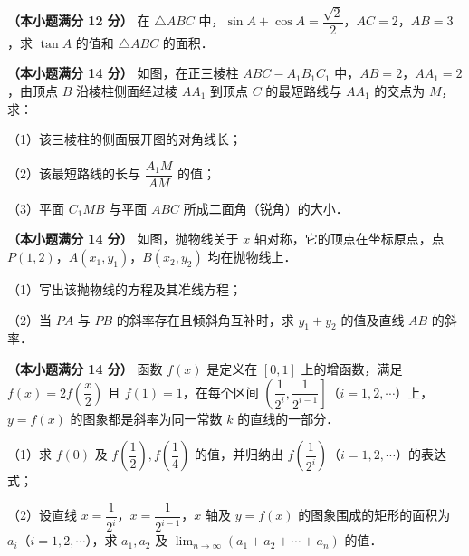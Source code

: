 \begin{question}
\textbf{（本小题满分 12 分）} 
在 $\triangle ABC$ 中，$\sin A+\cos A=\dfrac{\sqrt{2}}{2}$，$AC=2$，$AB=3$，求 $\tan A$ 的值和 $\triangle ABC$ 的面积．

\Needspace{0.4\textheight}
\end{question}
\begin{question}
\textbf{（本小题满分 14 分）} 
如图，在正三棱柱 $ABC-A_1B_1C_1$ 中，$AB=2$，$AA_1=2$，由顶点 $B$ 沿棱柱侧面经过棱 $AA_1$ 到顶点 $C$ 的最短路线与 $AA_1$ 的交点为 $M$，求：

（1）该三棱柱的侧面展开图的对角线长；

（2）该最短路线的长与 $\dfrac{A_1M}{AM}$ 的值；

（3）平面 $C_1MB$ 与平面 $ABC$ 所成二面角（锐角）的大小．
\nopagebreak[4]
\begin{center}\end{center}
\nopagebreak[4]
\Needspace{0.4\textheight}
\end{question}
\begin{question}
\textbf{（本小题满分 14 分）} 
如图，抛物线关于 $x$ 轴对称，它的顶点在坐标原点，点 $P(1, 2)$，$A(x_1, y_1)$，$B(x_2, y_2)$ 均在抛物线上．

（1）写出该抛物线的方程及其准线方程；

（2）当 $PA$ 与 $PB$ 的斜率存在且倾斜角互补时，求 $y_1+y_2$ 的值及直线 $AB$ 的斜率．
\nopagebreak[4]
\begin{center}\end{center}
\nopagebreak[4]
\end{question}
\begin{question}
\textbf{（本小题满分 14 分）} 
函数 $f(x)$ 是定义在 $[0, 1]$ 上的增函数，满足 $f(x)=2f\left(\dfrac{x}{2}\right)$ 且 $f(1)=1$，在每个区间 $\left(\dfrac{1}{2^i}, \dfrac{1}{2^{i-1}}\right]$（$i=1, 2, \cdots$）上，$y=f(x)$ 的图象都是斜率为同一常数 $k$ 的直线的一部分．

（1）求 $f(0)$ 及 $f\left(\dfrac{1}{2}\right), f\left(\dfrac{1}{4}\right)$ 的值，并归纳出 $f\left(\dfrac{1}{2^i}\right)$（$i=1, 2, \cdots$）的表达式；

（2）设直线 $x=\dfrac{1}{2^i}$，$x=\dfrac{1}{2^{i-1}}$，$x$ 轴及 $y=f(x)$ 的图象围成的矩形的面积为 $a_i$（$i=1, 2, \cdots$），求 $a_1, a_2$ 及 $\lim_{n\to\infty}(a_1+a_2+\cdots+a_n)$ 的值．

\end{question}

